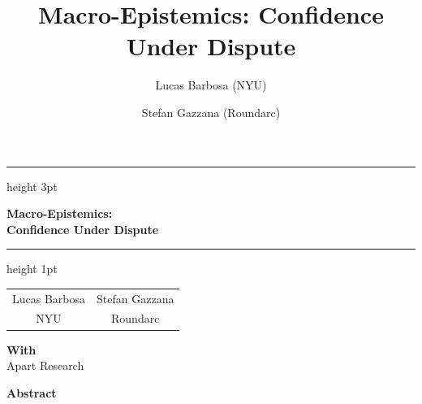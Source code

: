 \documentclass[11pt,letterpaper]{article}
\title{Macro-Epistemics: Confidence Under Dispute}
\author{Lucas Barbosa (NYU) \and Stefan Gazzana (Roundarc)}
\date{}
\begin{document}
\thispagestyle{correspondence}
\begin{center}
  \hrule height 3pt
  \vspace{18pt}
  {\fontsize{20}{24}\selectfont\bfseries
    Macro-Epistemics:\\Confidence Under Dispute\par}
  \vspace{18pt}
  \hrule height 1pt
  \vspace{18pt}
  \begin{tabular}{cc}
    Lucas Barbosa & Stefan Gazzana\\
    {\small NYU} & {\small Roundarc}
  \end{tabular}\par
  \vspace{8pt}
  \textbf{With}\\Apart Research
  \vspace{18pt}

  {\fontsize{14}{18}\selectfont\bfseries Abstract\par}
  \vspace{10pt}
  \begin{minipage}{0.7\textwidth}
    
  \end{minipage}
\end{center}


\end{document}
